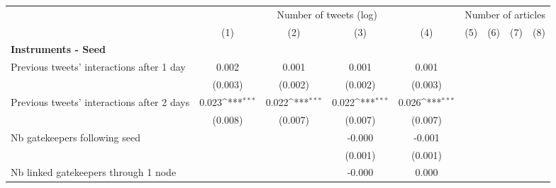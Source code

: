 {
\def\sym#1{\ifmmode^{#1}\else\(^{#1}\)\fi}
\begin{tabular}{l*{8}{c}}
\hline\hline
                    &\multicolumn{4}{c}{Number of tweets (log)}                                             &\multicolumn{4}{c}{Number of articles}                                                 \\\cmidrule(lr){2-5}\cmidrule(lr){6-9}
                    &\multicolumn{1}{c}{(1)}         &\multicolumn{1}{c}{(2)}         &\multicolumn{1}{c}{(3)}         &\multicolumn{1}{c}{(4)}         &\multicolumn{1}{c}{(5)}         &\multicolumn{1}{c}{(6)}         &\multicolumn{1}{c}{(7)}         &\multicolumn{1}{c}{(8)}         \\
\hline
\textbf{Instruments - Seed}&                     &                     &                     &                     &                     &                     &                     &                     \\
Previous tweets' interactions after 1 day&       0.002         &       0.001         &       0.001         &       0.001         &                     &                     &                     &                     \\
                    &     (0.003)         &     (0.002)         &     (0.002)         &     (0.003)         &                     &                     &                     &                     \\
Previous tweets' interactions after 2 days&       0.023\sym{***}&       0.022\sym{***}&       0.022\sym{***}&       0.026\sym{***}&                     &                     &                     &                     \\
                    &     (0.008)         &     (0.007)         &     (0.007)         &     (0.007)         &                     &                     &                     &                     \\
Nb gatekeepers following seed&                     &                     &      -0.000         &      -0.001         &                     &                     &                     &                     \\
                    &                     &                     &     (0.001)         &     (0.001)         &                     &                     &                     &                     \\
Nb linked gatekeepers through 1 node&                     &                     &      -0.000         &       0.000         &                     &                     &                     &                     \\

\end{tabular}}
